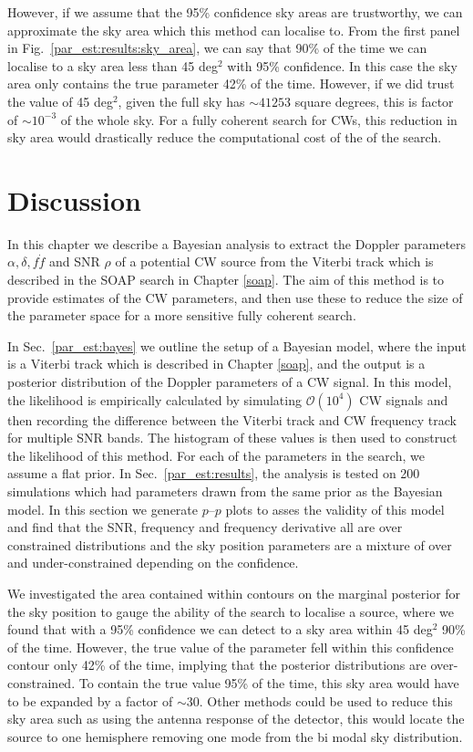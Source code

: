 However, if we assume that the 95\% confidence sky areas are trustworthy, we can approximate the sky area which this method can localise to. 
From the first panel in Fig.~\ref{par_est:results:sky_area}, we can say that 90\% of the time we can localise to a sky area
less than 45 deg$^2$ with 95\% confidence. In this case the sky area only contains the true parameter 42\% of the time. 
However, if we did trust the value of 45 deg$^2$, given the
full sky has $\sim 41253$ square degrees, this is factor of $\sim 10^{-3}$ of
the whole sky.  For a fully coherent search for \glspl{CW}, this reduction in sky area would
drastically reduce the computational cost of the of the search.


%
%
\section{Discussion}
%
%

In this chapter we describe a Bayesian
analysis to extract the Doppler parameters $\alpha, \delta, f \dot{f}$ and
\gls{SNR} $\rho$ of a potential \gls{CW} source from the Viterbi track which is
described in the SOAP search in Chapter \ref{soap}. The aim of
this method is to provide estimates of the \gls{CW} parameters, and then use
these to reduce the size of the parameter space for a more sensitive fully coherent search. 

In Sec.~\ref{par_est:bayes} we outline the setup of a Bayesian model,
where the input is a Viterbi track which is described in Chapter \ref{soap}, and the output is a posterior distribution of
the Doppler parameters of a \gls{CW} signal.  In this model, the likelihood is
empirically calculated by simulating $\mathcal{O}(10^4)$ \gls{CW} signals and
then recording the difference between the Viterbi track and \gls{CW} frequency
track for multiple \gls{SNR} bands.  The histogram of these values is
then used to construct the likelihood of this method.  For each of the
parameters in the search, we assume a flat prior.  In
Sec.~\ref{par_est:results}, the analysis is tested on 200 simulations which had
parameters drawn from the same prior as the Bayesian model.  In this section we
generate $p$--$p$ plots to asses the validity of this model and find that the
\gls{SNR}, frequency and frequency derivative all are over constrained
distributions and the sky position parameters are a mixture of over and under-constrained depending on the confidence. 

We investigated the area contained within contours on the marginal posterior
for the sky position to gauge the ability of the search to localise a source,
where we found that with a 95\% confidence we can detect to a sky area within
45 deg$^2$ 90\% of the time.  
However, the true value of the parameter fell within this confidence contour only 42\% of the
time, implying that the posterior distributions are over-constrained.
To contain the true value 95\% of the time, this sky area would have to be expanded by a factor of $\sim 30$.
Other methods could be used to reduce this sky area such as using the antenna response of the detector, this would locate the source to one hemisphere removing one mode from the bi modal sky distribution.

